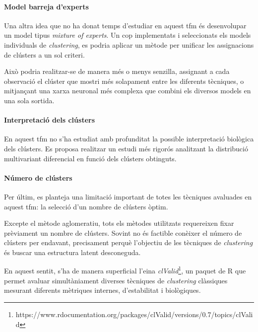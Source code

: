 \documentclass[CAT,BIB]{TFUOC}%
\begin{document}
        \paragraph{Model barreja d'experts}
            Una altra idea que no ha donat temps d'estudiar en aquest \gls{tfm}
            és desenvolupar un model tipus \textit{mixture of experts}.
            Un cop implementats i seleccionats els models individuals de \textit{clustering},
            es podria aplicar un mètode per unificar les assignacions
            de clústers a un sol criteri.

            Això podria realitzar-se de manera més o menys senzilla,
            assignant a cada observació el clúster que mostri més solapament
            entre les diferents tècniques,
            o mitjançant una xarxa neuronal més complexa
            que combini els diversos models en una sola sortida.

        \paragraph{Interpretació dels clústers}
            En aquest \gls{tfm} no s'ha estudiat amb profunditat
            la possible interpretació biològica dels clústers.
            Es proposa realitzar un estudi més rigorós
            analitzant la distribució multivariant diferencial en funció dels clústers obtinguts.

        \paragraph{Número de clústers}
            Per últim,
            es planteja una limitació important de totes les tècniques avaluades
            en aquest \gls{tfm}:
            la selecció d'un nombre de clústers òptim.

            Excepte el mètode aglomeratiu,
            tots els mètodes utilitzats requereixen fixar prèviament un nombre de clústers.
            Sovint no és factible conèixer el número de clústers per endavant,
            precisament perquè l'objectiu de les tècniques de \textit{clustering}
            és buscar una estructura latent desconeguda.

            En aquest sentit, s'ha de manera superficial l'eina \textit{clValid}\footnote{https://www.rdocumentation.org/packages/clValid/versions/0.7/topics/clValid},
            un paquet de R que permet avaluar simultàniament
            diverses tècniques de \textit{clustering} clàssiques
            mesurant diferents mètriques internes, d'estabilitat i biològiques.
\end{document}
